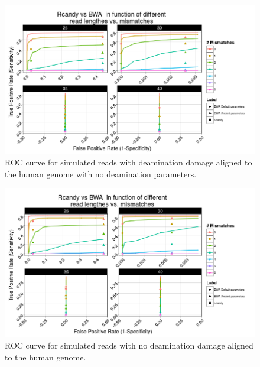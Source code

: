 \documentclass[11pt,a4paper]{report}
\begin{document}
\begin{figure}[H]
\centering
\includegraphics[width=12cm]{pictures/DS5.png}
\caption{ROC curve for simulated reads with deamination damage aligned to the human genome
         with no deamination parameters.}
\label{DS5}
\end{figure}

\begin{figure}[H]
\centering
\includegraphics[width=12cm]{pictures/DS6.png}
\caption{ROC curve for simulated reads with no deamination damage aligned to the human genome.}
\label{DS6}
\end{figure}





\end{document}
